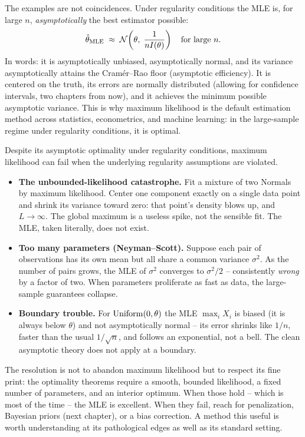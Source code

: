 \begin{aestheticbox}
The examples are not coincidences. Under regularity conditions the MLE is, for
large $n$, \emph{asymptotically} the best estimator possible:
\[
  \hat\theta_{\mathrm{MLE}} \;\approx\; \mathcal{N}\!\left(\theta,\; \frac{1}{nI(\theta)}\right)
  \quad\text{for large } n.
\]
In words: it is asymptotically unbiased, asymptotically normal, and its variance
asymptotically attains the Cram\'er--Rao floor (asymptotic efficiency). It is centered on
the truth, its errors are normally distributed (allowing for confidence intervals,
two chapters from now), and it achieves the minimum possible asymptotic variance.
This is why maximum likelihood is the default
estimation method across statistics, econometrics, and machine learning: in the
large-sample regime under regularity conditions, it is optimal.
\end{aestheticbox}

\begin{paradoxbox}
Despite its asymptotic optimality under regularity conditions, maximum likelihood can fail
when the underlying regularity assumptions are violated.
\begin{itemize}
\item \textbf{The unbounded-likelihood catastrophe.} Fit a mixture of two
  Normals by maximum likelihood. Center one component exactly on a single data
  point and shrink its variance toward zero: that point's density blows up, and
  $L\to\infty$. The global maximum is a useless spike, not the sensible fit.
  The MLE, taken literally, does not exist.
\item \textbf{Too many parameters (Neyman--Scott).} Suppose each pair of
  observations has its own mean but all share a common variance $\sigma^2$. As
  the number of pairs grows, the MLE of $\sigma^2$ converges to $\sigma^2/2$ --
  consistently \emph{wrong} by a factor of two. When parameters proliferate as
  fast as data, the large-sample guarantees collapse.
\item \textbf{Boundary trouble.} For $\operatorname{Uniform}(0,\theta)$ the MLE $\max_i X_i$ is
  biased (it is always below $\theta$) and not asymptotically normal -- its error
  shrinks like $1/n$, faster than the usual $1/\sqrt n$, and follows an
  exponential, not a bell. The clean asymptotic theory does not apply at
  a boundary.
\end{itemize}
The resolution is not to abandon maximum likelihood but to respect its fine
print: the optimality theorems require a smooth, bounded likelihood, a fixed
number of parameters, and an interior optimum. When those hold -- which is most
of the time -- the MLE is excellent. When they fail, reach for penalization,
Bayesian priors (next chapter), or a bias correction. A method this useful is
worth understanding at its pathological edges as well as its standard setting.
\end{paradoxbox}


